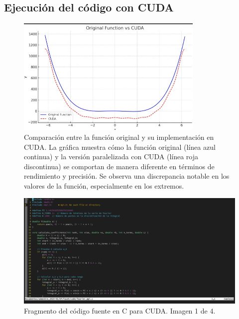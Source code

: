 \subsection{Ejecución del código con CUDA}
\begin{figure}[H]
	\includegraphics[width=0.8\textwidth]{media/resultados_cuda.jpeg}
	\caption{Comparación entre la función original y su implementación en CUDA. La gráfica muestra cómo la función original (línea azul continua) y la versión paralelizada con CUDA (línea roja discontinua) se comportan de manera diferente en términos de rendimiento y precisión. Se observa una discrepancia notable en los valores de la función, especialmente en los extremos.}
	\label{fig:comparacion_cuda}
\end{figure}

\begin{figure}
	\includegraphics[width=\textwidth]{media/codigo_cuda_1.png}
	\caption{Fragmento del código fuente en C para CUDA. Imagen 1 de 4.}
	\label{img:codigo_cuda_1}
\end{figure}

